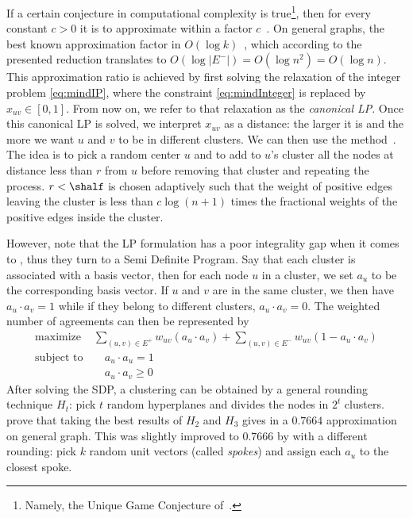 If a certain conjecture in computational complexity is true\footnote{Namely, the Unique Game
Conjecture of~\textcite{UGC02}.}, then for every constant $c>0$ it is \NPh{} to approximate \mmc{}
within a factor $c$~\autocite{MulticutHardness06}. On general graphs, the best known approximation factor in $O(\log
k)$~\autocite{RegionGrowing93}, which according to the presented reduction translates to
$O(\log|E^-|)=O(\log n^2)=O(\log n)$. This approximation ratio is achieved by first solving the
relaxation of the integer problem \eqref{eq:mindIP}, where the constraint \eqref{eq:mindInteger} is
replaced by $x_{uv}\in [0,1]$. From now on, we refer to that relaxation as the \emph{canonical
\mind{} LP}. Once this canonical \mind{} LP is solved, we interpret $x_{uv}$ as a distance: the
larger it is and the more we want $u$ and $v$ to be in different clusters. We can then use the
\regionGrow{} method~\autocite{RegionGrowing93}. The idea is to pick a random center $u$ and to add
to $u$'s cluster all the nodes at distance less than $r$ from $u$ before removing that cluster and
repeating the process. $r<\shalf$ is chosen adaptively such that the weight of positive edges
leaving the cluster is less than $c\log(n+1)$ times the fractional weights of the positive edges
inside the cluster.

However, \textcite[Theorem 2]{Charikar2003} note that the LP formulation has a poor integrality gap
when it comes to \maxa{}, thus they turn to a Semi Definite Program. Say that each cluster is
associated with a basis vector, then for each node $u$ in a cluster, we set $a_u$ to be the
corresponding basis vector. If $u$ and $v$ are in the same cluster, we then have $a_u\cdot a_v = 1$
while if they belong to different clusters, $a_u\cdot a_v = 0$. The weighted number of agreements
can then be represented by
\begin{align}
   \label{eq:maxaSDP}
   \text{maximize } & \sum_{(u,v)\in E^+} w_{uv}(a_u\cdot a_v) + \sum_{(u,v)\in E^-} w_{uv}(1-a_u\cdot a_v) \\
   \text{subject to}& \quad a_u\cdot a_u=1 \nonumber\\
   \phantom{subject to}& \quad a_u\cdot a_v\geq 0  \nonumber
\end{align}
After solving the SDP, a clustering can be obtained by a general rounding technique $H_t$: pick $t$
random hyperplanes and divides the nodes in $2^t$ clusters. \Textcite[Theorem 3]{Charikar2003} prove
that taking the best results of $H_2$ and $H_3$ gives in a $0.7664$ approximation on general graph.
This was slightly improved to $0.7666$ by \textcite{Swamy2004} with a different rounding: pick $k$
random unit vectors (called \emph{spokes}) and assign each $a_u$ to the closest spoke.

